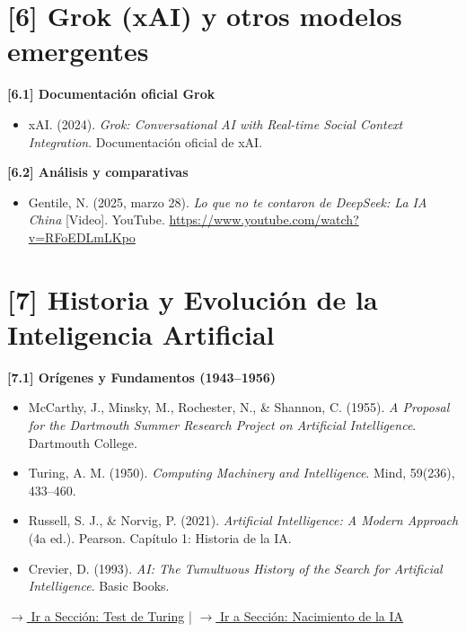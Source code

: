 \documentclass[12pt,a4paper]{report}
\numberwithin{figure}{section}
\begin{document}
\section*{[6] Grok (xAI) y otros modelos emergentes}
\label{ref:6}

\textbf{[6.1] Documentación oficial Grok}
\label{ref:6.1}
\begin{itemize}
  \item xAI. (2024). \textit{Grok: Conversational AI with Real-time Social Context Integration}. Documentación oficial de xAI.
\end{itemize}

\textbf{[6.2] Análisis y comparativas}
\label{ref:6.2}
\begin{itemize}
  \item Gentile, N. (2025, marzo 28). \textit{Lo que no te contaron de DeepSeek: La IA China} [Video]. YouTube. \url{https://www.youtube.com/watch?v=RFoEDLmLKpo}
\end{itemize}

\section*{[7] Historia y Evolución de la Inteligencia Artificial}
\label{ref:7}

\textbf{[7.1] Orígenes y Fundamentos (1943--1956)}
\label{ref:7.1}
\begin{itemize}
  \item McCarthy, J., Minsky, M., Rochester, N., \& Shannon, C. (1955). \textit{A Proposal for the Dartmouth Summer Research Project on Artificial Intelligence}. Dartmouth College.
  \item Turing, A. M. (1950). \textit{Computing Machinery and Intelligence}. Mind, 59(236), 433--460.
  \item Russell, S. J., \& Norvig, P. (2021). \textit{Artificial Intelligence: A Modern Approach} (4a ed.). Pearson. Capítulo 1: Historia de la IA.
  \item Crevier, D. (1993). \textit{AI: The Tumultuous History of the Search for Artificial Intelligence}. Basic Books.
\end{itemize}
\vspace{0.3em}
\hfill \hyperref[subsec:test_turing]{$\rightarrow$ Ir a Sección: Test de Turing} | \hyperref[subsec:nacimiento_ia]{$\rightarrow$ Ir a Sección: Nacimiento de la IA}
\vspace{0.5em}
\end{document}
